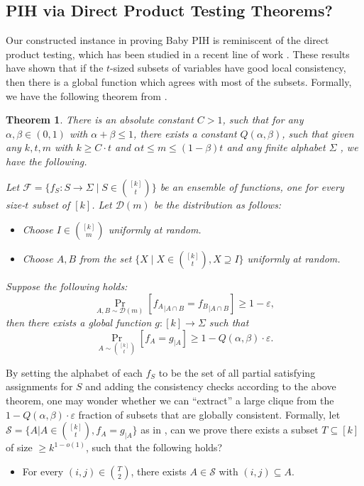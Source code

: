 \documentclass[10pt,a4paper]{article}
\newtheorem{theorem}{Theorem}
\begin{document}
\subsection{PIH via Direct Product Testing Theorems?}

Our constructed instance in proving Baby PIH is reminiscent of the direct product testing, which has been studied in a recent line of work \cite{DS14, DK17, DFH19}. These results have shown that if the $t$-sized subsets of variables have good local consistency, then there is a global function which agrees with most of the subsets. Formally, we have the following theorem from \cite{DFH19}.

\begin{theorem}
\label{thm:dir}
    There is an absolute constant $C>1$, such that for any $\alpha,\beta \in (0,1)$ with $\alpha+\beta \le 1$, there exists a constant $Q(\alpha,\beta)$, such that given any $k,t,m$ with $k \ge C \cdot t$ and $\alpha t \le m \le (1-\beta) t$ and any finite alphabet $\Sigma$ , we have the following.

    Let $\mathcal F=\{f_S:S \rightarrow \Sigma \mid S \in \binom{[k]}{t}\}$ be an ensemble of functions, one for every size-$t$ subset of $[k]$. Let $\mathcal D(m)$ be the distribution as follows:
    \begin{itemize}
        \item Choose $I \in \binom{[k]}{m}$ uniformly at random.
        \item Choose $A,B$ from the set $\{X \mid X \in \binom{[k]}{t}, X \supseteq I\}$ uniformly at random.
    \end{itemize}

    Suppose the following holds:
    \[
    \Pr_{A,B \sim \mathcal D(m)}[{f_A}_{|A \cap B} = {f_B}_{|A \cap B}] \ge 1-\varepsilon,
    \]
    then there exists a global function $g: [k] \rightarrow \Sigma$ such that
    \[
    \Pr_{A \sim \binom{[k]}{t}}[f_A = g_{|A}] \ge 1-Q(\alpha,\beta) \cdot \varepsilon.
    \]
\end{theorem}

By setting the alphabet of each $f_S$ to be the set of all partial satisfying assignments for $S$ and adding the consistency checks according to the above theorem, one may wonder whether we can ``extract'' a large clique from the $1-Q(\alpha,\beta)\cdot \varepsilon$ fraction of subsets that are globally consistent. Formally, let $\mathcal S=\{A | A \in \binom{[k]}{t} , f_A=g_{|A}\}$ as in , can we prove there exists a subset $T \subseteq [k]$ of size $\ge k^{1-o(1)}$, such that the following holds?
\begin{itemize}
    \item For every $(i,j) \in \binom{T}{2}$, there exists $A \in \mathcal S$ with $(i,j) \subseteq A$.
\end{itemize}
\end{document}
